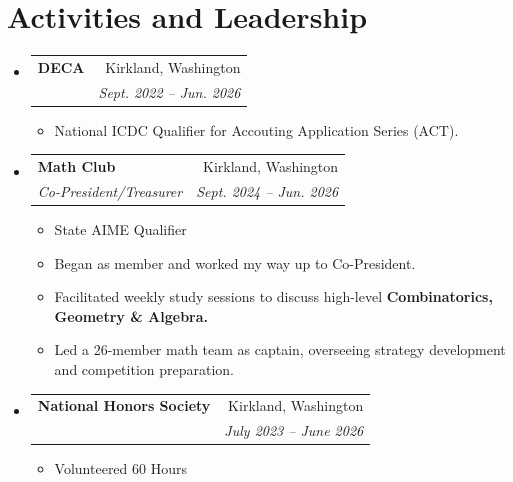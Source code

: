 \documentclass[letterpaper,11pt]{article}
\makeatletter
\newcommand{\resumeItem}[1]{
  \item[]\small{
    {#1 \vspace{-3pt}}
  }
}
\newcommand{\resumeSubheading}[4]{
  \vspace{-2pt}\item
    \begin{tabular*}{0.97\textwidth}[t]{l@{\extracolsep{\fill}}r}
      \textbf{#1} & #2 \\
      \textit{\small#3} & \textit{\small #4} \\
    \end{tabular*}\vspace{-7pt}
}
\newcommand{\resumeSubHeadingListStart}{\begin{itemize}[leftmargin=0in, label={}]}
\newcommand{\resumeSubHeadingListEnd}{\end{itemize}}
\newcommand{\resumeItemListStart}{\begin{itemize}[leftmargin=0.125in]}
\newcommand{\resumeItemListEnd}{\end{itemize}\vspace{-10pt}}
\newcommand{\key}[1] {\textbf{#1}}
\makeatother
\begin{document}
\section{Activities and Leadership}
  \resumeSubHeadingListStart

    \resumeSubheading
      {DECA}{Kirkland, Washington}
      {}{Sept. 2022 -- Jun. 2026}
      \vspace{-6mm}
      \resumeItemListStart
        \resumeItem{National ICDC Qualifier for Accouting Application Series (ACT).} 
      \resumeItemListEnd
    \resumeSubheading
      {Math Club}{Kirkland, Washington}
      {Co-President/Treasurer}{Sept. 2024 -- Jun. 2026}
      \resumeItemListStart
       \resumeItem{State AIME Qualifier}
        \resumeItem{Began as member and worked my way up to Co-President.}
        \resumeItem{Facilitated weekly study sessions to discuss high-level \key{Combinatorics, Geometry \& Algebra.}}
        \resumeItem{Led a 26-member math team as captain, overseeing strategy development and competition preparation.}
      \resumeItemListEnd
    
    \resumeSubheading
      {National Honors Society}{Kirkland, Washington}
      {}{July 2023 -- June 2026}
      \vspace{-15pt}
      \resumeItemListStart
        \resumeItem{Volunteered 60 Hours}
    \resumeItemListEnd

  \resumeSubHeadingListEnd

\end{document}
